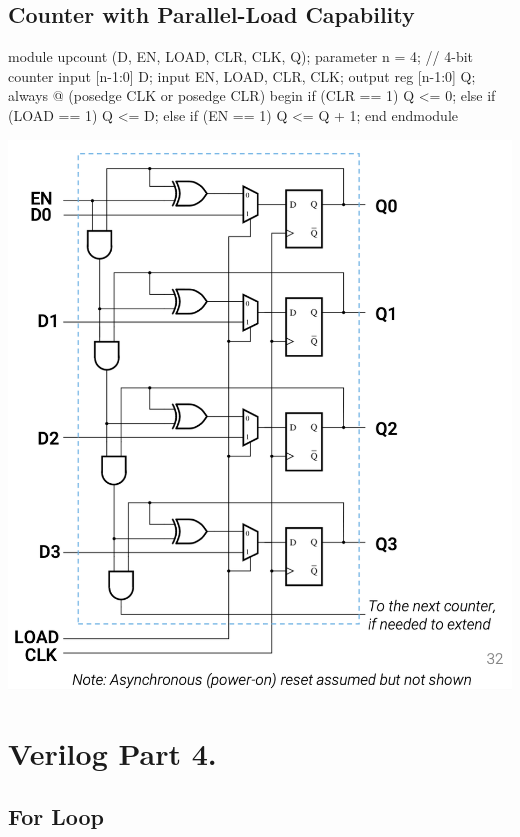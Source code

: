 \documentclass[12pt,openany]{book}
\begin{document}
\subsection{Counter with Parallel-Load Capability}
\begin{minipage}[htp]{0.4\textwidth}
\begin{vhdl}
module upcount (D, EN, LOAD, CLR, CLK, Q);
parameter n = 4; // 4-bit counter
input [n-1:0] D;
input EN, LOAD, CLR, CLK;
output reg [n-1:0] Q;
	always @ (posedge CLK or posedge CLR)
	begin
		if (CLR == 1) Q <= 0;
		else if (LOAD == 1) Q <= D;
		else if (EN == 1) Q <= Q + 1;
	end
endmodule
\end{vhdl}
\end{minipage}
\hfill
\vline
\hfill
\begin{minipage}[htp]{0.4\textwidth}
\includegraphics[width=1.3\textwidth]{circuits/14.5_3.png}
\end{minipage}	

\section{Verilog Part 4.}
\subsection{For Loop}
\end{document}
